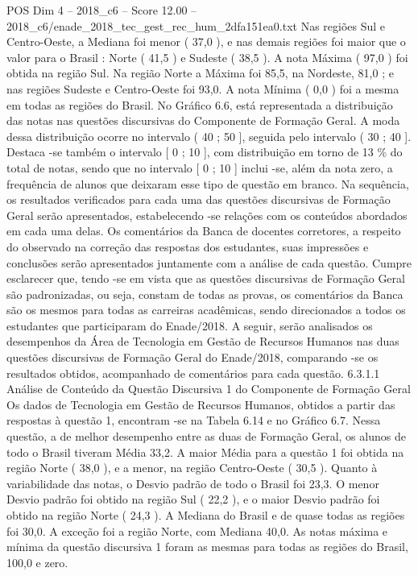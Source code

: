 \begin{textsample}{POS Dim 4 – 2018\_c6 – Score 12.00 – 2018\_c6/enade\_2018\_tec\_gest\_rec\_hum\_2dfa151ea0.txt}
Nas regiões Sul e Centro-Oeste, a Mediana foi menor ( 37,0 ), e nas demais regiões foi maior que o valor para o Brasil : Norte ( 41,5 ) e Sudeste ( 38,5 ).
A nota Máxima ( 97,0 ) foi obtida na região Sul.
Na região Norte a Máxima foi 85,5, na Nordeste, 81,0 ; e nas regiões Sudeste e Centro-Oeste foi 93,0.
A nota Mínima ( 0,0 ) foi a mesma em todas as regiões do Brasil.
No Gráfico 6.6, está representada a distribuição das notas nas questões discursivas do Componente de Formação Geral.
A moda dessa distribuição ocorre no intervalo ( 40 ; 50 ], seguida pelo intervalo ( 30 ; 40 ].
Destaca -se também o intervalo [ 0 ; 10 ], com distribuição em torno de 13 \% do total de notas, sendo que no intervalo [ 0 ; 10 ] inclui -se, além da nota zero, a frequência de alunos que deixaram esse tipo de questão em branco.
Na sequência, os resultados verificados para cada uma das questões discursivas de Formação Geral serão apresentados, estabelecendo -se relações com os conteúdos abordados em cada uma delas.
Os comentários da Banca de docentes corretores, a respeito do observado na correção das respostas dos estudantes, suas impressões e conclusões serão apresentados juntamente com a análise de cada questão.
Cumpre esclarecer que, tendo -se em vista que as questões discursivas de Formação Geral são padronizadas, ou seja, constam de todas as provas, os comentários da Banca são os mesmos para todas as carreiras acadêmicas, sendo direcionados a todos os estudantes que participaram do Enade/2018.
A seguir, serão analisados os desempenhos da Área de Tecnologia em Gestão de Recursos Humanos nas duas questões discursivas de Formação Geral do Enade/2018, comparando -se os resultados obtidos, acompanhado de comentários para cada questão. 6.3.1.1 Análise de Conteúdo da Questão Discursiva 1 do Componente de Formação Geral Os dados de Tecnologia em Gestão de Recursos Humanos, obtidos a partir das respostas à questão 1, encontram -se na Tabela 6.14 e no Gráfico 6.7.
Nessa questão, a de melhor desempenho entre as duas de Formação Geral, os alunos de todo o Brasil tiveram Média 33,2.
A maior Média para a questão 1 foi obtida na região Norte ( 38,0 ), e a menor, na região Centro-Oeste ( 30,5 ).
Quanto à variabilidade das notas, o Desvio padrão de todo o Brasil foi 23,3.
O menor Desvio padrão foi obtido na região Sul ( 22,2 ), e o maior Desvio padrão foi obtido na região Norte ( 24,3 ).
A Mediana do Brasil e de quase todas as regiões foi 30,0.
A exceção foi a região Norte, com Mediana 40,0.
As notas máxima e mínima da questão discursiva 1 foram as mesmas para todas as regiões do Brasil, 100,0 e zero.

\end{textsample}
